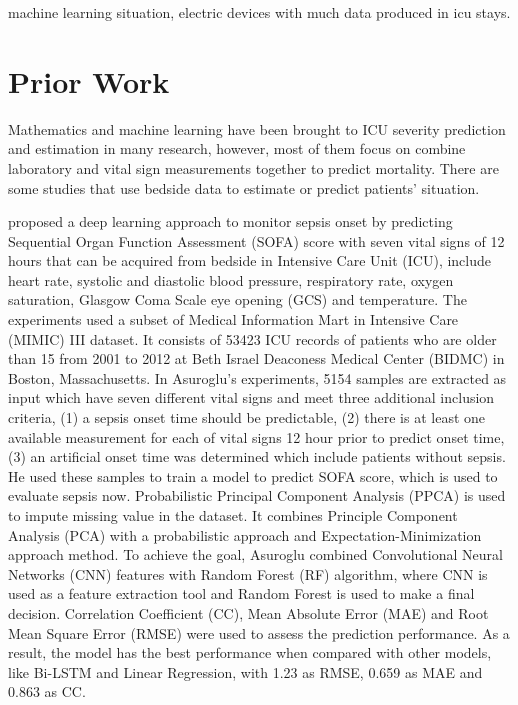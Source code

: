 \documentclass[12pt,a4paper,english
]{tunithesis}
\begin{document}
machine learning situation,
electric devices with much data produced in icu stays.



\chapter{Prior Work}
\label{ch:priorwork}
Mathematics and machine learning have been brought to ICU severity prediction and estimation in many research, however, most of them focus on combine laboratory and vital sign measurements together to predict mortality. There are some studies that use bedside data to estimate or predict patients' situation.

\textcite{asuroglu2021} proposed a deep learning approach to monitor sepsis onset by predicting Sequential Organ Function Assessment (SOFA) score with seven vital signs of 12 hours that can be acquired from bedside in Intensive Care Unit (ICU), include heart rate, systolic and diastolic blood pressure, respiratory rate, oxygen saturation, Glasgow Coma Scale eye opening (GCS) and temperature. The experiments used a subset of Medical Information Mart in Intensive Care (MIMIC) III dataset. It consists of 53423 ICU records of patients who are older than 15 from 2001 to 2012 at Beth Israel Deaconess Medical Center (BIDMC) in Boston, Massachusetts. In Asuroglu's experiments, 5154 samples are extracted as input which have seven different vital signs and meet three additional inclusion criteria, (1) a sepsis onset time should be predictable, (2) there is at least one available measurement for each of vital signs 12 hour prior to predict onset time, (3) an artificial onset time was determined which include patients without sepsis. He used these samples to train a model to predict SOFA score, which is used to evaluate sepsis now. Probabilistic Principal Component Analysis (PPCA) is used to impute missing value in the dataset. It combines Principle Component Analysis (PCA) with a probabilistic approach and Expectation-Minimization approach method. To achieve the goal, Asuroglu combined Convolutional Neural Networks (CNN) features with Random Forest (RF) algorithm, where CNN is used as a feature extraction tool and Random Forest is used to make a final decision. Correlation Coefficient (CC), Mean Absolute Error (MAE) and Root Mean Square Error (RMSE) were used to assess the prediction performance. As a result, the model has the best performance when compared with other models, like Bi-LSTM and Linear Regression, with 1.23 as RMSE, 0.659 as MAE and 0.863 as CC.
\end{document}
